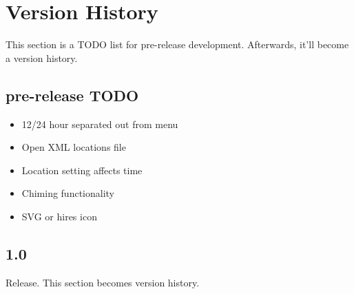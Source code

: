 \section{Version History}

This section is a TODO list for pre-release development. Afterwards, it'll become a version history.

\subsection{pre-release TODO}
\begin{itemize}
    \item 12/24 hour separated out from menu
    \item Open XML locations file
    \item Location setting affects time
    \item Chiming functionality
    \item SVG or hires icon
\end{itemize}
\subsection{1.0}

Release. This section becomes version history.

